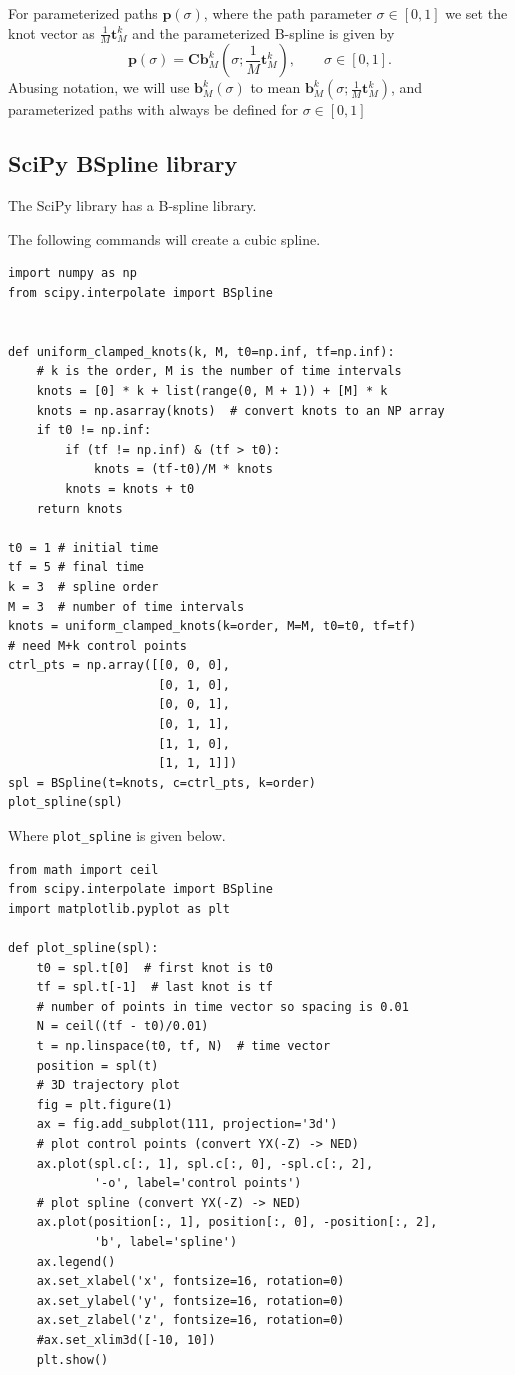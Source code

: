 \documentclass{article}
\newcommand{\bbf}{\mathbf{b}}
\newcommand{\Cbf}{\mathbf{C}}
\begin{document}
For parameterized paths $\mathbf{p}(\sigma)$, where the path parameter $\sigma\in[0,1]$ we set the knot vector as $\frac{1}{M}\mathbf{t}_{M}^k$
and the parameterized B-spline is given by
\[
\mathbf{p}(\sigma) = \Cbf \bbf_M^k(\sigma; \frac{1}{M}\mathbf{t}_{M}^k), \qquad \sigma\in[0, 1].
\]
Abusing notation, we will use $\bbf_M^k(\sigma)$ to mean $\bbf_M^k(\sigma; \frac{1}{M}\mathbf{t}_{M}^k)$, and parameterized paths with always be defined for $\sigma\in[0,1]$

\subsection{SciPy BSpline library}
The SciPy library has a B-spline library.  

The following commands will create a cubic spline.
\begin{lstlisting}
import numpy as np
from scipy.interpolate import BSpline
	
	
def uniform_clamped_knots(k, M, t0=np.inf, tf=np.inf):
    # k is the order, M is the number of time intervals
    knots = [0] * k + list(range(0, M + 1)) + [M] * k
    knots = np.asarray(knots)  # convert knots to an NP array
    if t0 != np.inf:
        if (tf != np.inf) & (tf > t0):
            knots = (tf-t0)/M * knots
        knots = knots + t0
    return knots	

t0 = 1 # initial time
tf = 5 # final time
k = 3  # spline order
M = 3  # number of time intervals
knots = uniform_clamped_knots(k=order, M=M, t0=t0, tf=tf)
# need M+k control points
ctrl_pts = np.array([[0, 0, 0],  
                     [0, 1, 0],
                     [0, 0, 1],
                     [0, 1, 1],
                     [1, 1, 0],
                     [1, 1, 1]])
spl = BSpline(t=knots, c=ctrl_pts, k=order)
plot_spline(spl)
\end{lstlisting}

Where {\tt plot\_spline} is given below.
\begin{lstlisting}
from math import ceil
from scipy.interpolate import BSpline
import matplotlib.pyplot as plt

def plot_spline(spl):
    t0 = spl.t[0]  # first knot is t0
    tf = spl.t[-1]  # last knot is tf
    # number of points in time vector so spacing is 0.01
    N = ceil((tf - t0)/0.01)
    t = np.linspace(t0, tf, N)  # time vector
    position = spl(t)
    # 3D trajectory plot
    fig = plt.figure(1)
    ax = fig.add_subplot(111, projection='3d')
    # plot control points (convert YX(-Z) -> NED)
    ax.plot(spl.c[:, 1], spl.c[:, 0], -spl.c[:, 2],
            '-o', label='control points')
    # plot spline (convert YX(-Z) -> NED)
    ax.plot(position[:, 1], position[:, 0], -position[:, 2],
            'b', label='spline')
    ax.legend()
    ax.set_xlabel('x', fontsize=16, rotation=0)
    ax.set_ylabel('y', fontsize=16, rotation=0)
    ax.set_zlabel('z', fontsize=16, rotation=0)
    #ax.set_xlim3d([-10, 10])
    plt.show()
\end{lstlisting}
\end{document}
